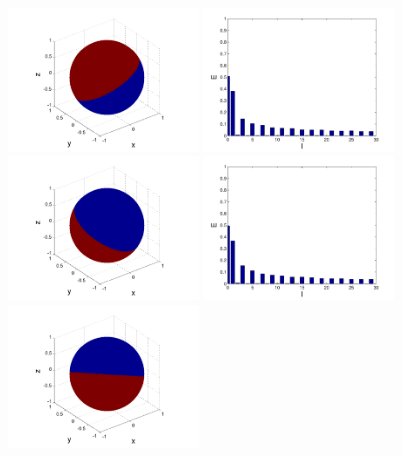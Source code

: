 \begin{refsection}
\begin{figure}
\centering
\includegraphics[width=0.45\textwidth]{kugel/kSpektrum/Kugel_1_1.pdf}
\includegraphics[width=0.45\textwidth]{kugel/kSpektrum/Kugel_1_2.pdf}
\includegraphics[width=0.45\textwidth]{kugel/kSpektrum/Kugel_2_1.pdf}
\includegraphics[width=0.45\textwidth]{kugel/kSpektrum/Kugel_2_2.pdf}
\includegraphics[width=0.45\textwidth]{kugel/kSpektrum/Kugel_3_1.pdf}

\end{figure}
\end{refsection}
